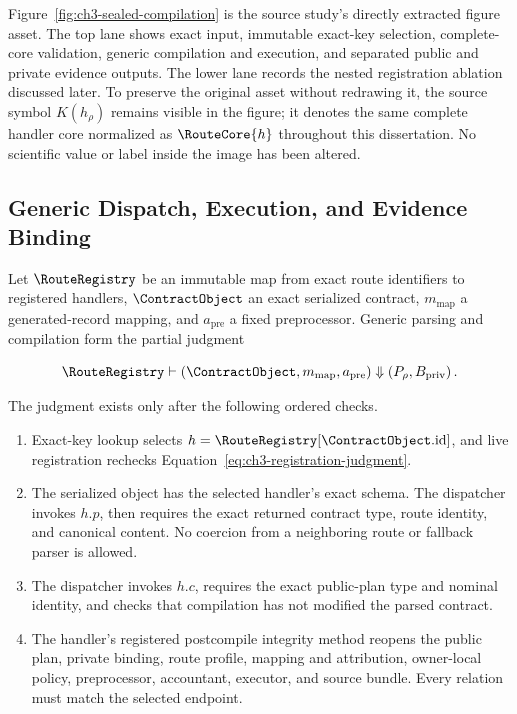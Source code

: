 Figure~\ref{fig:ch3-sealed-compilation} is the source study's directly extracted
figure asset.  The top lane shows exact input, immutable exact-key selection,
complete-core validation, generic compilation and execution, and separated public
and private evidence outputs.  The lower lane records the nested registration
ablation discussed later.  To preserve the original asset without redrawing it,
the source symbol \(K(h_\rho)\) remains visible in the figure; it denotes the same
complete handler core normalized as \(\RouteCore{h}\) throughout this
dissertation.  No scientific value or label inside the image has been altered.

\subsection{Generic Dispatch, Execution, and Evidence Binding}
\label{subsec:ch3-generic-dispatch}

Let \(\RouteRegistry\) be an immutable map from exact route identifiers to
registered handlers, \(\ContractObject\) an exact serialized contract,
\(m_{\mathrm{map}}\) a generated-record mapping, and \(a_{\mathrm{pre}}\) a fixed
preprocessor.  Generic parsing and compilation form the partial judgment

\begin{equation}
    \RouteRegistry
    \vdash
    \left(
        \ContractObject,
        m_{\mathrm{map}},
        a_{\mathrm{pre}}
    \right)
    \Downarrow
    \left(
        P_{\rho},
        B_{\mathrm{priv}}
    \right).
\label{eq:ch3-compile-judgment}
\end{equation}

The judgment exists only after the following ordered checks.

\begin{enumerate}
    \item Exact-key lookup selects
    \(h=\RouteRegistry[\ContractObject.\mathrm{id}]\), and live registration
    rechecks Equation~\eqref{eq:ch3-registration-judgment}.

    \item The serialized object has the selected handler's exact schema.  The
    dispatcher invokes \(h.p\), then requires the exact returned contract type,
    route identity, and canonical content.  No coercion from a neighboring route
    or fallback parser is allowed.

    \item The dispatcher invokes \(h.c\), requires the exact public-plan type and
    nominal identity, and checks that compilation has not modified the parsed
    contract.

    \item The handler's registered postcompile integrity method reopens the
    public plan, private binding, route profile, mapping and attribution,
    owner-local policy, preprocessor, accountant, executor, and source bundle.
    Every relation must match the selected endpoint.
\end{enumerate}

